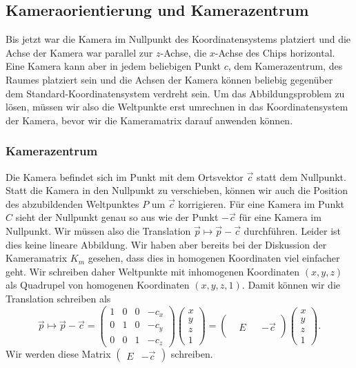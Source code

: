 %
%
%
\subsection{Kameraorientierung und Kamerazentrum\label{section:kameraorientierung}}
Bis jetzt war die Kamera im Nullpunkt des Koordinatensystems platziert
und die Achse der Kamera war parallel zur $z$-Achse, die $x$-Achse des Chips
horizontal.
Eine Kamera kann aber in jedem beliebigen Punkt $c$, dem Kamerazentrum,
des Raumes platziert sein und die Achsen der Kamera können beliebig gegenüber
dem Standard-Koordinatensystem verdreht sein.
Um das Abbildungsproblem zu lösen, müssen wir also die Weltpunkte erst
umrechnen in das Koordinatensystem der Kamera, bevor wir die Kameramatrix
darauf anwenden können.

\subsubsection{Kamerazentrum}
Die Kamera befindet sich im Punkt mit dem Ortsvektor $\vec{c}$ statt dem
Nullpunkt.
Statt die Kamera in den Nullpunkt zu verschieben, können wir auch die
Position des abzubildenden Weltpunktes $P$ um $\vec{c}$ korrigieren.
Für eine Kamera im Punkt $C$ sieht der Nullpunkt genau so aus wie
der Punkt $-\vec{c}$ für eine Kamera im Nullpunkt.
Wir müssen also die Translation $\vec{p}\mapsto \vec{p}-\vec{c}$ durchführen.
Leider ist dies keine lineare Abbildung.
Wir haben aber bereits bei der Diskussion der Kameramatrix $K_m$
gesehen, dass dies in homogenen Koordinaten viel einfacher geht.
Wir schreiben daher Weltpunkte mit inhomogenen Koordinaten
$(x,y,z)$ als Quadrupel von homogenen Koordinaten $(x,y,z,1)$.
Damit können wir die Translation schreiben als
\[
\vec{p} \mapsto \vec{p}-\vec{c} =
\begin{pmatrix}
1&0&0&-c_x\\
0&1&0&-c_y\\
0&0&1&-c_z
\end{pmatrix}
\begin{pmatrix}
x\\y\\z\\1
\end{pmatrix}
=
\begin{pmatrix}
& & &  \\
&E& &-\vec{c}\\
& & &  
\end{pmatrix}
\begin{pmatrix}
x\\y\\z\\1
\end{pmatrix}.
\]
Wir werden diese Matrix $\begin{pmatrix}E&-\vec{c}\end{pmatrix}$ schreiben.


